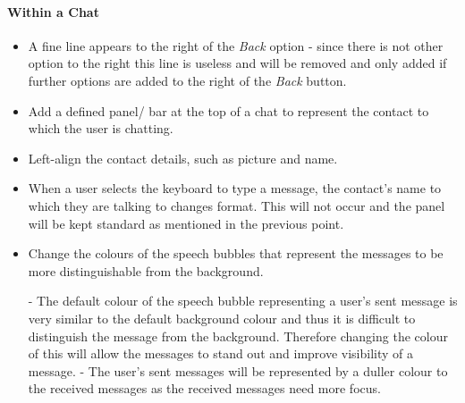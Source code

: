 \documentclass[11pt]{article}
\begin{document}
\paragraph{Within a Chat}
\begin{itemize}
\item A	fine line appears to the right of the \textit{Back} option - since there is not other option to the right this line is useless and will be removed and only added if further options are added to the right of the \textit{Back} button.

\item	Add a defined panel/ bar at the top of a chat to represent the contact to which the user is chatting. 

\item	Left-align the contact details, such as picture and name.

\item When a user selects the keyboard to type a message, the contact's name to which they are talking to changes format. This will not occur and the panel will be kept standard as mentioned in the previous point.

\item	Change the colours of the speech bubbles that represent the messages to be more distinguishable from the background.

\subitem	- The default colour of the speech bubble representing a user's sent message is very similar to the default background colour and thus it is difficult to distinguish the message from the background. Therefore changing the colour of this will allow the messages to stand out and improve visibility of a message.
\subitem 	- The user's sent messages will be represented by a duller colour to the received messages as the received messages need more focus.


\end{itemize}
\end{document}
